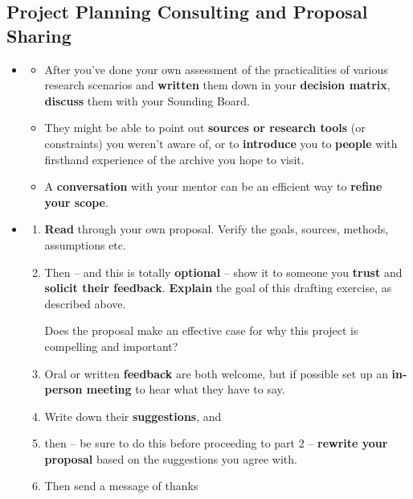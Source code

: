 \documentclass[11pt]{article}
\begin{document}
\subsection{Project Planning Consulting and Proposal Sharing}
\begin{itemize}
\item \begin{exercise} 
\begin{itemize}
\item After you’ve done your own assessment of the practicalities of various research scenarios and \textbf{written} them down in your \textbf{decision matrix}, \textbf{discuss} them with your Sounding Board. 

\item They might be able to point out \textbf{sources or research tools} (or constraints) you weren’t aware of, or to \textbf{introduce} you to \textbf{people} with firsthand experience of the archive you hope to visit. 

\item A \textbf{conversation} with your mentor can be an efficient way to \textbf{refine your scope}.
\end{itemize}
\end{exercise}

\vspace{20pt}
\item \begin{exercise}
\begin{enumerate}
\item \textbf{Read} through your own proposal. Verify the goals, sources, methods, assumptions etc.

\item Then -- and this is totally \textbf{optional} -- show it to someone you \textbf{trust} and \textbf{solicit their feedback}. \textbf{Explain} the goal of this drafting exercise, as described above. 

Does the proposal make an effective case for why this project is compelling and important?

\item Oral or written \textbf{feedback} are both welcome, but if possible set up an \textbf{in-person meeting} to hear what they have to say. 

\item Write down their \textbf{suggestions}, and

\item then -- be sure to do this before proceeding to part 2 -- \textbf{rewrite your proposal} based on the suggestions you agree with.

\item Then send a message of thanks
\end{enumerate}
\end{exercise}
\end{itemize}
\end{document}
